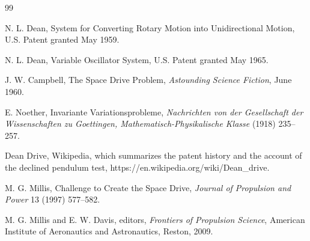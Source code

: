 \documentclass[11pt]{article}
\begin{document}
\begin{thebibliography}{99}

 N. L. Dean, System for Converting Rotary Motion into Unidirectional Motion, U.S. Patent granted May 1959.

 N. L. Dean, Variable Oscillator System, U.S. Patent granted May 1965.

 J. W. Campbell, The Space Drive Problem, \emph{Astounding Science Fiction}, June 1960.

 E. Noether, Invariante Variationsprobleme, \emph{Nachrichten von der Gesellschaft der Wissenschaften zu Goettingen, Mathematisch-Physikalische Klasse} (1918) 235--257.

 Dean Drive, Wikipedia, which summarizes the patent history and the account of the declined pendulum test, https://en.wikipedia.org/wiki/Dean\_drive.

 M. G. Millis, Challenge to Create the Space Drive, \emph{Journal of Propulsion and Power} 13 (1997) 577--582.

 M. G. Millis and E. W. Davis, editors, \emph{Frontiers of Propulsion Science}, American Institute of Aeronautics and Astronautics, Reston, 2009.

\end{thebibliography}
\end{document}

